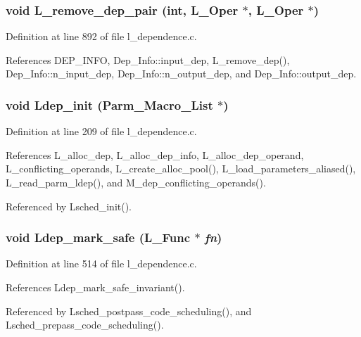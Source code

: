 \subsubsection{\setlength{\rightskip}{0pt plus 5cm}void L\_\-remove\_\-dep\_\-pair (int, L\_\-Oper $\ast$, L\_\-Oper $\ast$)}\label{l__dependence_8h_56c4fb84c90b08674cad178142a61973}




Definition at line 892 of file l\_\-dependence.c.

References DEP\_\-INFO, Dep\_\-Info::input\_\-dep, L\_\-remove\_\-dep(), Dep\_\-Info::n\_\-input\_\-dep, Dep\_\-Info::n\_\-output\_\-dep, and Dep\_\-Info::output\_\-dep.
\subsubsection{\setlength{\rightskip}{0pt plus 5cm}void Ldep\_\-init (\bf{Parm\_\-Macro\_\-List} $\ast$)}\label{l__dependence_8h_d2a4936e04bc8c14dd34d18d914e9980}




Definition at line 209 of file l\_\-dependence.c.

References L\_\-alloc\_\-dep, L\_\-alloc\_\-dep\_\-info, L\_\-alloc\_\-dep\_\-operand, L\_\-conflicting\_\-operands, L\_\-create\_\-alloc\_\-pool(), L\_\-load\_\-parameters\_\-aliased(), L\_\-read\_\-parm\_\-ldep(), and M\_\-dep\_\-conflicting\_\-operands().

Referenced by Lsched\_\-init().
\subsubsection{\setlength{\rightskip}{0pt plus 5cm}void Ldep\_\-mark\_\-safe (L\_\-Func $\ast$ {\em fn})}\label{l__dependence_8h_eb5239833bb75d328e2e84dd49f420f0}




Definition at line 514 of file l\_\-dependence.c.

References Ldep\_\-mark\_\-safe\_\-invariant().

Referenced by Lsched\_\-postpass\_\-code\_\-scheduling(), and Lsched\_\-prepass\_\-code\_\-scheduling().
